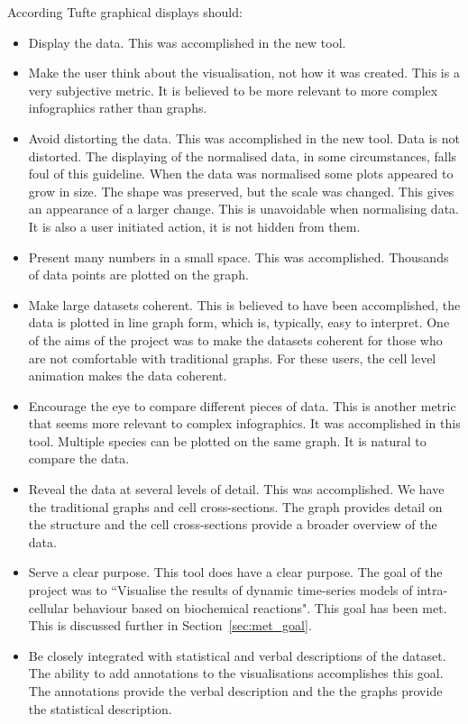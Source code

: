 According Tufte graphical displays should:
\begin{itemize}
\item Display the data.  This was accomplished in the new tool.
\item Make the user think about the visualisation, not how it was created.  This is a very subjective metric.  It is believed to be more relevant to more complex infographics rather than graphs.
\item Avoid distorting the data.  This was accomplished in the new tool.  Data is not distorted.  The displaying of the normalised data, in some circumstances, falls foul of this guideline.  When the data was normalised some plots appeared to grow in size.  The shape was preserved, but the scale was changed.  This gives an appearance of a larger change.  This is unavoidable when normalising data.  It is also a user initiated action, it is not hidden from them.
\item Present many numbers in a small space.  This was accomplished.  Thousands of data points are plotted on the graph.
\item Make large datasets coherent.  This is believed to have been accomplished, the data is plotted in line graph form, which is, typically, easy to interpret.  One of the aims of the project was to make the datasets coherent for those who are not comfortable with traditional graphs.  For these users, the cell level animation makes the data coherent.
\item Encourage the eye to compare different pieces of data.  This is another metric that seems more relevant to complex infographics.  It was accomplished in this tool.  Multiple species can be plotted on the same graph.  It is natural to compare the data.
\item Reveal the data at several levels of detail.  This was accomplished.
We have the traditional graphs and cell cross-sections.  The graph provides detail on the structure and the cell cross-sections provide a broader overview of the data.
\item Serve a clear purpose.  This tool does have a clear purpose. The goal of the project was to ``Visualise the results of dynamic time-series models of intra-cellular behaviour based on biochemical reactions".  This goal has been met.  This is discussed further in Section~\ref{sec:met_goal}.
\item Be closely integrated with statistical and verbal descriptions of the dataset.  The ability to add annotations to the visualisations accomplishes this goal.  The annotations provide the verbal description and the the graphs provide the statistical description.
\end{itemize}

